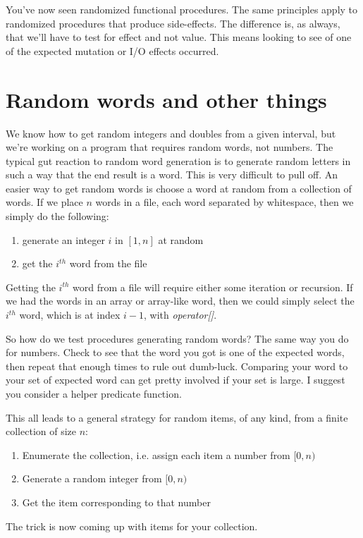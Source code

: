 \documentclass[]{tufte-handout}
\begin{document}
You've now seen randomized functional procedures.  The same principles apply to randomized procedures that produce side-effects. The difference is, as always, that we'll have to test for effect and not value.  This means looking to see of one of the expected mutation or I/O effects occurred.  


\section{Random words and other things}

We know how to get random integers and doubles from a given interval, but we're working on a program that requires random words, not numbers.  The typical gut reaction to random word generation is to generate random letters in such a way that the end result is a word. This is very difficult to pull off. An easier way to get random words is choose a word at random from a collection of words. If we place $n$ words in a file, each word separated by whitespace, then we simply do the following:
\begin{enumerate}
\item generate an integer $i$ in $[1,n]$ at random
\item get the $i^{th}$ word from the file
\end{enumerate}
Getting the $i^{th}$ word from a file will require either some iteration or recursion. If we had the words in an array or array-like word, then we could simply select the $i^{th}$ word, which is at index $i-1$, with \textit{operator[]}.  

So how do we test procedures generating random words? The same way you do for numbers. Check to see that the word you got is one of the expected words, then repeat that enough times to rule out dumb-luck. Comparing your word to your set of expected word can get pretty involved if your set is large. I suggest you consider a helper predicate function.

This all leads to a general strategy for random items, of any kind, from a finite collection of size $n$: 
\begin{enumerate}
\item Enumerate the collection, i.e. assign each item a number from $[0,n)$
\item Generate a random integer from $[0,n)$
\item Get the item corresponding to that number
\end{enumerate}
The trick is now coming up with items for your collection. 
\end{document}
